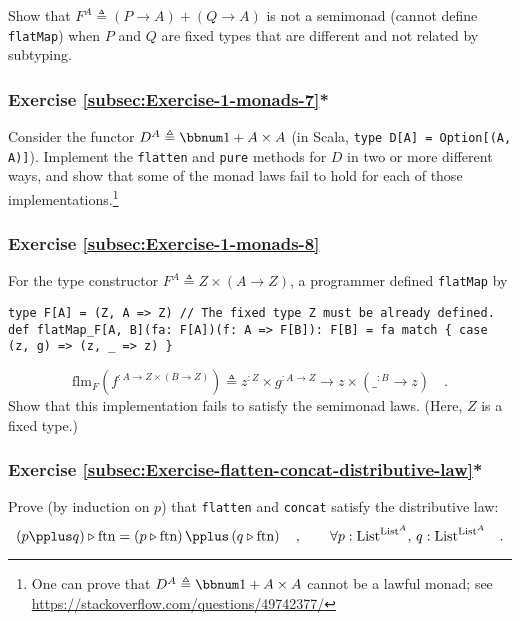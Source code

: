 Show that $F^{A}\triangleq\left(P\rightarrow A\right)+\left(Q\rightarrow A\right)$
is not a semimonad (cannot define \lstinline!flatMap!) when $P$
and $Q$ are fixed types that are different and not related by subtyping.

\subsubsection{Exercise \label{subsec:Exercise-1-monads-7}\ref{subsec:Exercise-1-monads-7}{*}}

Consider the functor $D^{A}\triangleq\bbnum 1+A\times A$ (in Scala,
\lstinline!type D[A] = Option[(A, A)]!). Implement the \lstinline!flatten!
and \lstinline!pure! methods for $D$ in two or more different ways,
and show that some of the monad laws fail to hold for each of those
implementations.\footnote{One can prove that $D^{A}\triangleq\bbnum 1+A\times A$ cannot be
a lawful monad; see \href{https://stackoverflow.com/questions/49742377/}{https://stackoverflow.com/questions/49742377/}}

\subsubsection{Exercise \label{subsec:Exercise-1-monads-8}\ref{subsec:Exercise-1-monads-8}}

For the type constructor $F^{A}\triangleq Z\times\left(A\rightarrow Z\right)$,
a programmer defined \lstinline!flatMap! by
\begin{lstlisting}
type F[A] = (Z, A => Z) // The fixed type Z must be already defined.
def flatMap_F[A, B](fa: F[A])(f: A => F[B]): F[B] = fa match { case (z, g) => (z, _ => z) }
\end{lstlisting}
\[
\text{flm}_{F}(f^{:A\rightarrow Z\times\left(B\rightarrow Z\right)})\triangleq z^{:Z}\times g^{:A\rightarrow Z}\rightarrow z\times(\_^{:B}\rightarrow z)\quad.
\]
Show that this implementation fails to satisfy the semimonad laws.
(Here, $Z$ is a fixed type.)

\subsubsection{Exercise \label{subsec:Exercise-flatten-concat-distributive-law}\ref{subsec:Exercise-flatten-concat-distributive-law}{*}}

Prove (by induction on $p$) that \lstinline!flatten! and \lstinline!concat!
satisfy the distributive law:
\[
\left(p\pplus q\right)\triangleright\text{ftn}=\left(p\triangleright\text{ftn}\right)\pplus\left(q\triangleright\text{ftn}\right)\quad,\quad\quad\forall p:\text{List}^{\text{List}^{A}},\,q:\text{List}^{\text{List}^{A}}\quad.
\]


